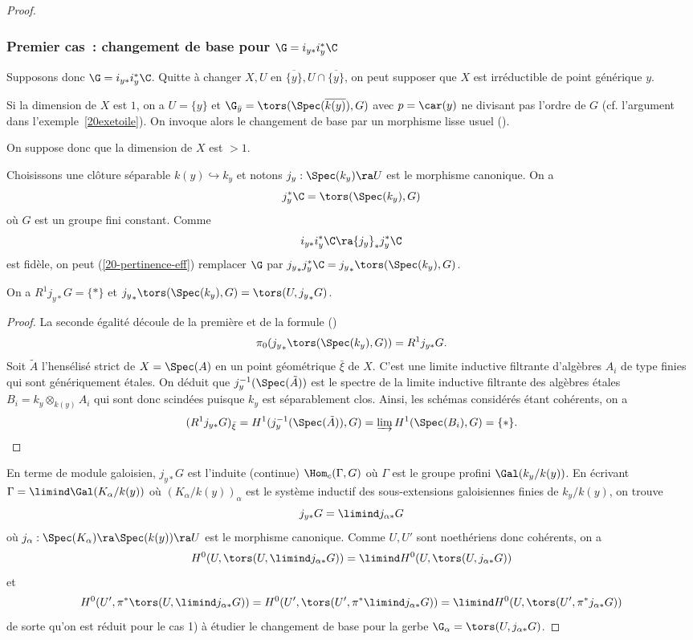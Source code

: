 \documentclass[10pt]{../fichiers-configuration-latex/smfart}
\begin{document}
\begin{proof}
\subsubsection{Premier cas : changement de base pour
$\G=i_{y*}i_{y}^*\C$}

Supposons donc $\G=i_{y*}i_{y}^*\C$. Quitte à changer $X,U$ en $\overline{\{y\}},
U\cap\overline{\{y\}}$, on peut supposer que $X$ est irréductible de point générique $y$.

Si la dimension de $X$ est  $1$, on a $U=\{y\}$ et $\G_{\bar y}=\tors(\Spec(\overline{k(y)}),G)$
avec  $p=\car(y)$ ne divisant pas l'ordre de $G$ (cf. l'argument dans l'exemple~\ref{20exetoile}).
On invoque alors le changement de base par un morphisme lisse usuel (\cite[VII.2.1.2]{CNA@Giraud}).

On suppose donc que la dimension de $X$ est $>1$.

Choisissons une clôture séparable $k(y)\hookrightarrow k_y$ et notons ${j_y}:\Spec(k_y)\ra U$ est le
morphisme canonique. On a $$j_y^*\C=\tors(\Spec(k_y),G)$$ où $G$ est un groupe fini constant. Comme
$$i_{y*}i_y^*\C\ra {j_y}_*j_y^*\C$$ est fidèle, on peut (\ref{20-pertinence-eff}) remplacer $\G$ par
${j_y}_*j_y^*\C={j_y}_*\tors(\Spec(k_y),G)$.

\begin{lemme2} On a $R^1j_{y*}G=\{*\}$ et
${j_y}_*\tors(\Spec(k_y),G)=\tors(U,{j_y}_*G)$.\end{lemme2} \begin{proof} La seconde égalité découle
de la première et de la formule (\cite[V.3.1.5]{CNA@Giraud})
$$\pi_0({j_y}_*\tors(\Spec(k_y),G))=R^1j_{y*}G.$$ Soit $\tilde A$ l'hensélisé strict de $X=\Spec(A)$
en un point géométrique $\bar\xi$ de $X$. C'est une limite inductive filtrante d'algèbres $A_i$ de
type finies qui sont génériquement étales. On déduit que $j_y^{-1}(\Spec(\tilde A))$ est le spectre
de la limite inductive filtrante des algèbres étales $B_i=k_y\otimes_{k(y)}A_i$ qui sont donc
scindées puisque $k_y$ est séparablement clos. Ainsi, les schémas considérés étant cohérents, on a
$$(R^1j_{y*}G)_{\bar\xi}=H^1(j_y^{-1}(\Spec(\tilde A)),G)=\varinjlim
H^1(\Spec(B_i),G)=\{*\}.$$\end{proof}

En terme de module galoisien, $j_{y*}G$ est l'induite (continue) $\Hom_c(\Gamma,G)$ où
$\Gamma$ est le groupe profini $\Gal(k_y/k(y))$. En écrivant $\Gamma=\limind
\Gal(K_\alpha/k(y))$ où $(K_\alpha/k(y))_\alpha$ est le système inductif des sous-extensions
galoisiennes finies de $k_y/k(y)$, on trouve $$j_{y*}G=\limind j_{\alpha*}G$$ où
$j_\alpha:\Spec(K_\alpha)\ra\Spec(k(y))\ra U$ est le morphisme canonique. Comme $U, U'$ sont
noethériens donc cohérents, on a $$H^0(U,\tors(U,\limind j_{\alpha*}G))=\limind H^0(U,\tors(U,
j_{\alpha*}G))$$ et $$H^0(U',\pi^*\tors(U,\limind j_{\alpha*}G))=H^0(U',\tors(U',\pi^*\limind
j_{\alpha*}G))=\limind H^0(U,\tors(U', \pi^*j_{\alpha*}G))$$ de sorte qu'on est réduit pour le cas
1) à étudier le changement de base pour la gerbe $\G_\alpha=\tors(U,j_{\alpha*}G)$.



\end{proof}
\end{document}
